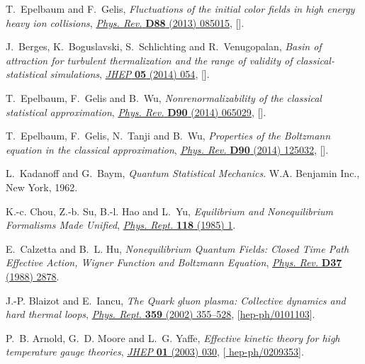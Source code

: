 \documentclass[onecolumn,showpacs,nobibnotes,nofootinbib,12pt,aps,prd,showpacs,notitlepage,nofootinbib,preprintnumbers,amsmath,amssymb]{article}
\begin{document}
\begin{thebibliography}{10}
T.~Epelbaum and F.~Gelis, \emph{{Fluctuations of the initial color fields in
  high energy heavy ion collisions}},
  \href{https://doi.org/10.1103/PhysRevD.88.085015}{\emph{Phys. Rev.}
  {\bfseries D88} (2013) 085015},
  [\href{https://arxiv.org/abs/1307.1765}{{}}].

J.~Berges, K.~Boguslavski, S.~Schlichting and R.~Venugopalan, \emph{{Basin of
  attraction for turbulent thermalization and the range of validity of
  classical-statistical simulations}},
  \href{https://doi.org/10.1007/JHEP05(2014)054}{\emph{JHEP} {\bfseries 05}
  (2014) 054}, [\href{https://arxiv.org/abs/1312.5216}{{}}].

T.~Epelbaum, F.~Gelis and B.~Wu, \emph{{Nonrenormalizability of the classical
  statistical approximation}},
  \href{https://doi.org/10.1103/PhysRevD.90.065029}{\emph{Phys. Rev.}
  {\bfseries D90} (2014) 065029},
  [\href{https://arxiv.org/abs/1402.0115}{{}}].

T.~Epelbaum, F.~Gelis, N.~Tanji and B.~Wu, \emph{{Properties of the Boltzmann
  equation in the classical approximation}},
  \href{https://doi.org/10.1103/PhysRevD.90.125032}{\emph{Phys. Rev.}
  {\bfseries D90} (2014) 125032},
  [\href{https://arxiv.org/abs/1409.0701}{{}}].

L.~Kadanoff and G.~Baym, \emph{Quantum Statistical Mechanics}.
\newblock W.A. Benjamin Inc., New York, 1962.

K.-c. Chou, Z.-b. Su, B.-l. Hao and L.~Yu, \emph{{Equilibrium and
  Nonequilibrium Formalisms Made Unified}},
  \href{https://doi.org/10.1016/0370-1573(85)90136-X}{\emph{Phys. Rept.}
  {\bfseries 118} (1985) 1}.

E.~Calzetta and B.~L. Hu, \emph{{Nonequilibrium Quantum Fields: Closed Time
  Path Effective Action, Wigner Function and Boltzmann Equation}},
  \href{https://doi.org/10.1103/PhysRevD.37.2878}{\emph{Phys. Rev.} {\bfseries
  D37} (1988) 2878}.

J.-P. Blaizot and E.~Iancu, \emph{{The Quark gluon plasma: Collective dynamics
  and hard thermal loops}},
  \href{https://doi.org/10.1016/S0370-1573(01)00061-8}{\emph{Phys. Rept.}
  {\bfseries 359} (2002) 355--528},
  [\href{https://arxiv.org/abs/hep-ph/0101103}{{\ttfamily hep-ph/0101103}}].

P.~B. Arnold, G.~D. Moore and L.~G. Yaffe, \emph{{Effective kinetic theory for
  high temperature gauge theories}},
  \href{https://doi.org/10.1088/1126-6708/2003/01/030}{\emph{JHEP} {\bfseries
  01} (2003) 030}, [\href{https://arxiv.org/abs/hep-ph/0209353}{{\ttfamily
  hep-ph/0209353}}].


\end{thebibliography}
\end{document}

